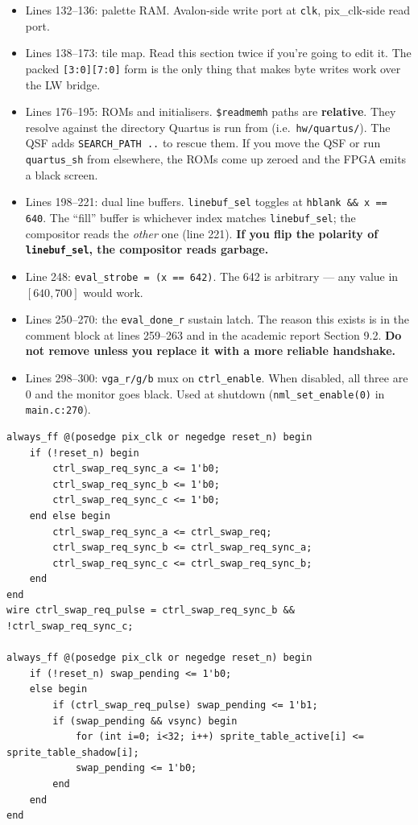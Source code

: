 \documentclass[11pt,letterpaper]{article}
\begin{document}
\begin{itemize}[leftmargin=*]
    on pix\_clk. sprite\_eval drives \texttt{raddr} and expects
    \texttt{rdata} next cycle through.
  \item Lines 132--136: palette RAM. Avalon-side write port at \texttt{clk},
    pix\_clk-side read port.
  \item Lines 138--173: tile map. Read this section twice if you're going
    to edit it. The packed \texttt{[3:0][7:0]} form is the only thing that
    makes byte writes work over the LW bridge.
  \item Lines 176--195: ROMs and initialisers. \texttt{\$readmemh} paths are
    \textbf{relative}. They resolve against the directory Quartus is run
    from (i.e.\ \texttt{hw/quartus/}). The QSF adds \texttt{SEARCH\_PATH ..}
    to rescue them. If you move the QSF or run \texttt{quartus\_sh} from
    elsewhere, the ROMs come up zeroed and the FPGA emits a black screen.
  \item Lines 198--221: dual line buffers. \texttt{linebuf\_sel} toggles at
    \texttt{hblank \&\& x == 640}. The ``fill'' buffer is whichever index
    matches \texttt{linebuf\_sel}; the compositor reads the \emph{other}
    one (line 221). \textbf{If you flip the polarity of
    \texttt{linebuf\_sel}, the compositor reads garbage.}
  \item Line 248: \texttt{eval\_strobe = (x == 642)}. The 642 is arbitrary
    --- any value in $[640, 700]$ would work.
  \item Lines 250--270: the \texttt{eval\_done\_r} sustain latch. The reason
    this exists is in the comment block at lines 259--263 and in the
    academic report Section 9.2. \textbf{Do not remove unless you replace it with
    a more reliable handshake.}
  \item Lines 298--300: \texttt{vga\_r/g/b} mux on \texttt{ctrl\_enable}.
    When disabled, all three are 0 and the monitor goes black. Used at
    shutdown (\texttt{nml\_set\_enable(0)} in \texttt{main.c:270}).
\end{itemize}

\begin{lstlisting}[style=sv, caption={SWAP cross-clock-domain machinery (\texttt{hw/nml\_gpu.sv:94--118}).}]
always_ff @(posedge pix_clk or negedge reset_n) begin
    if (!reset_n) begin
        ctrl_swap_req_sync_a <= 1'b0;
        ctrl_swap_req_sync_b <= 1'b0;
        ctrl_swap_req_sync_c <= 1'b0;
    end else begin
        ctrl_swap_req_sync_a <= ctrl_swap_req;
        ctrl_swap_req_sync_b <= ctrl_swap_req_sync_a;
        ctrl_swap_req_sync_c <= ctrl_swap_req_sync_b;
    end
end
wire ctrl_swap_req_pulse = ctrl_swap_req_sync_b && !ctrl_swap_req_sync_c;

always_ff @(posedge pix_clk or negedge reset_n) begin
    if (!reset_n) swap_pending <= 1'b0;
    else begin
        if (ctrl_swap_req_pulse) swap_pending <= 1'b1;
        if (swap_pending && vsync) begin
            for (int i=0; i<32; i++) sprite_table_active[i] <= sprite_table_shadow[i];
            swap_pending <= 1'b0;
        end
    end
end
\end{lstlisting}
\end{document}
